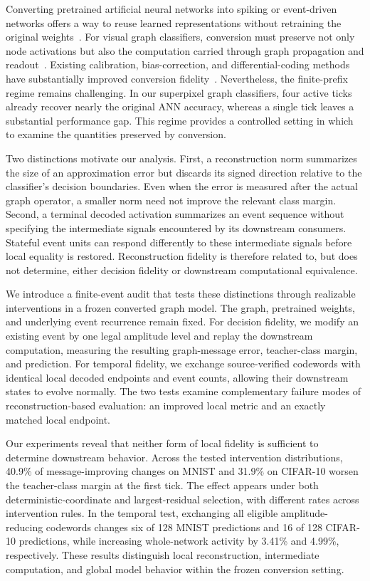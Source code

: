 \documentclass[10pt,twocolumn,letterpaper]{article}
\begin{document}
Converting pretrained artificial neural networks into spiking or event-driven networks offers a way to reuse learned representations without retraining the original weights~\cite{maass1997,rueckauer2017,li2021,wu2024ftbc,huang2025}. For visual graph classifiers, conversion must preserve not only node activations but also the computation carried through graph propagation and readout~\cite{dwivedi2023,han2022vig}. Existing calibration, bias-correction, and differential-coding methods have substantially improved conversion fidelity~\cite{diehl2015,sengupta2019,han2020rmp,liu2022spikeconverter,bojkovic2024,hao2023residual,li2024erroraware,wang2025adaptivecalibration}. Nevertheless, the finite-prefix regime remains challenging. In our superpixel graph classifiers, four active ticks already recover nearly the original ANN accuracy, whereas a single tick leaves a substantial performance gap. This regime provides a controlled setting in which to examine the quantities preserved by conversion.

Two distinctions motivate our analysis. First, a reconstruction norm summarizes the size of an approximation error but discards its signed direction relative to the classifier's decision boundaries. Even when the error is measured after the actual graph operator, a smaller norm need not improve the relevant class margin. Second, a terminal decoded activation summarizes an event sequence without specifying the intermediate signals encountered by its downstream consumers. Stateful event units can respond differently to these intermediate signals before local equality is restored. Reconstruction fidelity is therefore related to, but does not determine, either decision fidelity or downstream computational equivalence.

We introduce a finite-event audit that tests these distinctions through realizable interventions in a frozen converted graph model. The graph, pretrained weights, and underlying event recurrence remain fixed. For decision fidelity, we modify an existing event by one legal amplitude level and replay the downstream computation, measuring the resulting graph-message error, teacher-class margin, and prediction. For temporal fidelity, we exchange source-verified codewords with identical local decoded endpoints and event counts, allowing their downstream states to evolve normally. The two tests examine complementary failure modes of reconstruction-based evaluation: an improved local metric and an exactly matched local endpoint.

Our experiments reveal that neither form of local fidelity is sufficient to determine downstream behavior. Across the tested intervention distributions, 40.9\% of message-improving changes on MNIST and 31.9\% on CIFAR-10 worsen the teacher-class margin at the first tick. The effect appears under both deterministic-coordinate and largest-residual selection, with different rates across intervention rules. In the temporal test, exchanging all eligible amplitude-reducing codewords changes six of 128 MNIST predictions and 16 of 128 CIFAR-10 predictions, while increasing whole-network activity by 3.41\% and 4.99\%, respectively. These results distinguish local reconstruction, intermediate computation, and global model behavior within the frozen conversion setting.
\end{document}
